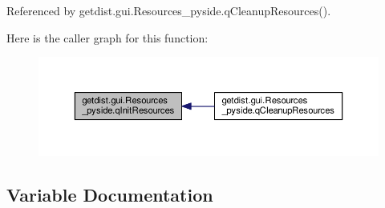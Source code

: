 Referenced by getdist.\+gui.\+Resources\+\_\+pyside.\+q\+Cleanup\+Resources().

Here is the caller graph for this function\+:
\nopagebreak
\begin{figure}[H]
\begin{center}
\leavevmode
\includegraphics[width=350pt]{namespacegetdist_1_1gui_1_1Resources__pyside_a0cc0e01d43533b37582a95a0061db0f8_icgraph}
\end{center}
\end{figure}


\subsection{Variable Documentation}
\mbox{\label{namespacegetdist_1_1gui_1_1Resources__pyside_af50cbd25e144ba8f3b789c2151ac1918}} 
